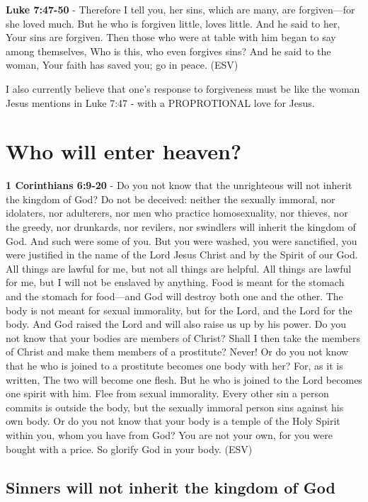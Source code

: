 \documentclass[11pt]{article}
\begin{document}
\textbf{Luke 7:47-50} -  Therefore I tell you, her sins, which are many, are forgiven—for she loved much.  But he who is forgiven little, loves little.  And he said to her, Your sins are forgiven.  Then those who were at table with him began to say among themselves, Who is this, who even forgives sins?  And he said to the woman, Your faith has saved you; go in peace.  (ESV)

I also currently believe that one's response to forgiveness must be like the woman Jesus mentions in Luke 7:47 - with a PROPROTIONAL love for Jesus.

\section{Who will enter heaven?}
\label{sec:org9c06ed4}
\textbf{1 Corinthians 6:9-20} -  Do you not know that the unrighteous will not inherit the kingdom of God?  Do not be deceived: neither the sexually immoral, nor idolaters, nor adulterers, nor men who practice homosexuality, nor thieves, nor the greedy, nor drunkards, nor revilers, nor swindlers will inherit the kingdom of God.  And such were some of you.  But you were washed, you were sanctified, you were justified in the name of the Lord Jesus Christ and by the Spirit of our God.  All things are lawful for me, but not all things are helpful.  All things are lawful for me, but I will not be enslaved by anything.  Food is meant for the stomach and the stomach for food—and God will destroy both one and the other.  The body is not meant for sexual immorality, but for the Lord, and the Lord for the body.  And God raised the Lord and will also raise us up by his power.  Do you not know that your bodies are members of Christ?  Shall I then take the members of Christ and make them members of a prostitute?  Never! Or do you not know that he who is joined to a prostitute becomes one body with her?  For, as it is written, The two will become one flesh.  But he who is joined to the Lord becomes one spirit with him.  Flee from sexual immorality.  Every other sin a person commits is outside the body, but the sexually immoral person sins against his own body.  Or do you not know that your body is a temple of the Holy Spirit within you, whom you have from God?  You are not your own, for you were bought with a price.  So glorify God in your body.  (ESV)

\subsection{Sinners will not inherit the kingdom of God}
\label{sec:org8232ef7}
\end{document}
